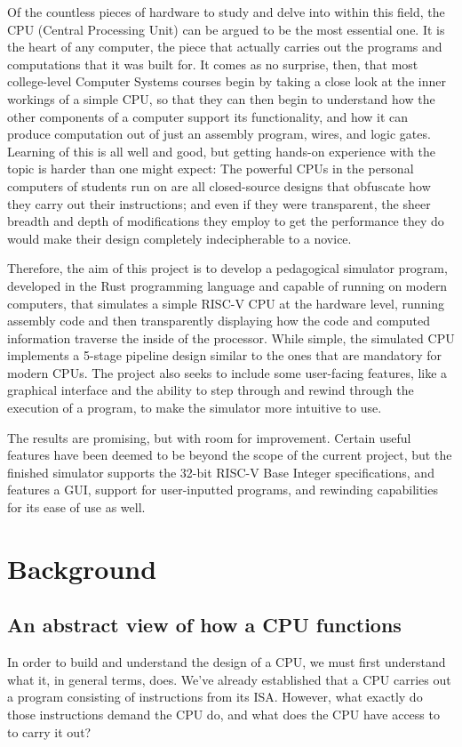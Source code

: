 \documentclass[12pt,twoside]{reedthesis}
\begin{document}
Of the countless pieces of hardware to study and delve into within this field, the CPU (Central Processing Unit) can be argued to be the most essential one. It is the heart of any computer, the piece that actually carries out the programs and computations that it was built for. It comes as no surprise, then, that most college-level Computer Systems courses begin by taking a close look at the inner workings of a simple CPU, so that they can then begin to understand how the other components of a computer support its functionality, and how it can produce computation out of just an assembly program, wires, and logic gates. Learning of this is all well and good, but getting hands-on experience with the topic is harder than one might expect: The powerful CPUs in the personal computers of students run on are all closed-source designs that obfuscate how they carry out their instructions; and even if they were transparent, the sheer breadth and depth of modifications they employ to get the performance they do would make their design completely indecipherable to a novice.

Therefore, the aim of this project is to develop a pedagogical simulator program, developed in the Rust programming language and capable of running on modern computers, that simulates a simple RISC-V CPU at the hardware level, running assembly code and then transparently displaying how the code and computed information traverse the inside of the processor. While simple, the simulated CPU implements a 5-stage pipeline design similar to the ones that are mandatory for modern CPUs. The project also seeks to include some user-facing features, like a graphical interface and the ability to step through and rewind through the execution of a program, to make the simulator more intuitive to use.

The results are promising, but with room for improvement. Certain useful features have been deemed to be beyond the scope of the current project, but the finished simulator supports the 32-bit RISC-V Base Integer specifications, and features a GUI, support for user-inputted programs, and rewinding capabilities for its ease of use as well.

\chapter{Background}
\section{An abstract view of how a CPU functions}
In order to build and understand the design of a CPU, we must first understand what it, in general terms, does. We've already established that a CPU carries out a program consisting of instructions from its ISA. However, what exactly do those instructions demand the CPU do, and what does the CPU have access to to carry it out?
\end{document}
